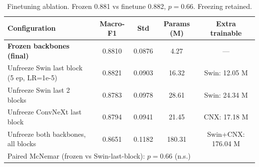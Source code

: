 \begin{table}[t]
\centering
\small
\caption{Finetuning ablation. Frozen 0.881 vs finetune 0.882, $p=0.66$. Freezing retained.}
\label{tab:finetune_ablation_detailed}
\begin{tabular}{lcccc}
\toprule
\textbf{Configuration} & \textbf{Macro-F1} & \textbf{Std} & \textbf{Params (M)} & \textbf{Extra trainable} \\
\midrule
\textbf{Frozen backbones (final)} & 0.8810 & 0.0876 & 4.27 & — \\
Unfreeze Swin last block (5 ep, LR=1e-5) & 0.8821 & 0.0903 & 16.32 & Swin: 12.05 M \\
Unfreeze Swin last 2 blocks & 0.8783 & 0.0978 & 28.61 & Swin: 24.34 M \\
Unfreeze ConvNeXt last block & 0.8794 & 0.0941 & 21.45 & CNX: 17.18 M \\
Unfreeze both backbones, all blocks & 0.8651 & 0.1182 & 180.31 & Swin+CNX: 176.04 M \\
\midrule
\multicolumn{5}{l}{Paired McNemar (frozen vs Swin-last-block): $p = 0.66$ (n.s.)} \\
\bottomrule
\end{tabular}
\end{table}
